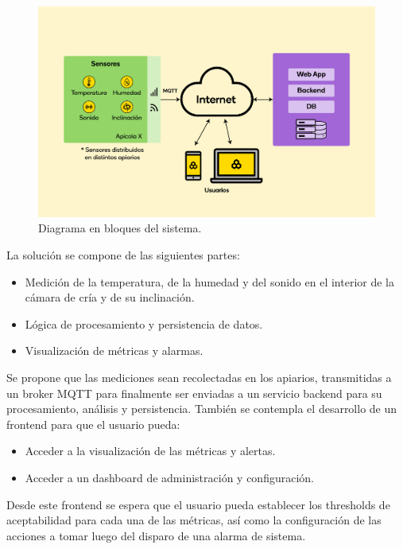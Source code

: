 \documentclass[
11pt, %
codirector, %
]{charter}
\begin{document}
\begin{figure}[htpb]
\centering 
\includegraphics[width=1\textwidth]{./Figuras/diagBloquesPropio.jpg}
\caption{Diagrama en bloques del sistema.}
\label{fig:diagBloques}
\end{figure}



La solución se compone de las siguientes partes:
\begin{itemize}
\item Medición de la temperatura, de la humedad y del sonido en el interior de la cámara de cría y de su inclinación.
\item Lógica de procesamiento y persistencia de datos.
\item Visualización de métricas y alarmas.
\end{itemize}

Se propone que las mediciones sean recolectadas en los apiarios, transmitidas a un broker MQTT para finalmente ser enviadas a un servicio backend para su procesamiento, análisis y persistencia.
También se contempla el desarrollo de un frontend para que el usuario pueda:
\begin{itemize}
\item Acceder a la visualización de las métricas y alertas.
\item Acceder a un dashboard de administración y configuración.
\end{itemize}
Desde este frontend se espera que el usuario pueda establecer los thresholds de aceptabilidad para cada una de las métricas, así como la configuración de las acciones a tomar luego del disparo de una alarma de sistema.

\end{document}
